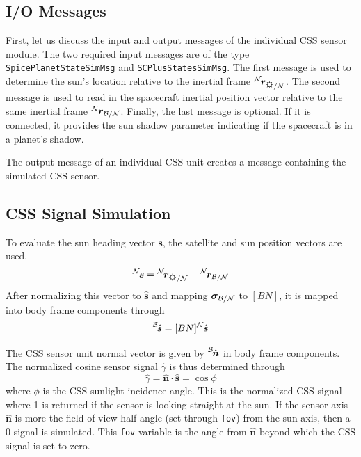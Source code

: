 \documentclass[]{BasiliskReportMemo}
\begin{document}
\subsection{I/O Messages}
First, let us discuss the input and output messages of the individual CSS sensor module.  The two required input messages are of the type {\tt SpicePlanetStateSimMsg} and {\tt SCPlusStatesSimMsg}.  The first message is used to determine the sun's location relative to the inertial frame $\leftexp{N}{\bm r}_{\sun/\mathcal{N}}$.  The second message is used to read in the spacecraft inertial position vector relative to the same inertial frame $\leftexp{N}{\bm r}_{\cal B/N}$.  Finally, the last message is optional.  If it is connected, it provides the sun shadow parameter indicating if the spacecraft is in a planet's shadow.  

The output message of an individual CSS unit creates a message containing the simulated CSS sensor.


\subsection{CSS Signal Simulation}
To evaluate the sun heading vector $\bm s$, the satellite and sun position vectors are used.
\begin{equation}
	\leftexp{N}{\bm s} = \leftexp{N}{\bm r}_{\sun/\mathcal{N}} - \leftexp{N}{\bm r}_{\cal B/N}
\end{equation}
After normalizing this vector to $\hat{\bm s}$ and mapping $\bm\sigma_{\cal B/N}$ to $[BN]$, it is mapped into body frame components through
\begin{equation}
	\leftexp{B}{\hat{\bm s}} = [BN] \leftexp{N}{\hat{\bm s}}
\end{equation}

The CSS sensor unit normal vector is given by $\leftexp{B}{\hat{\bm n}}$ in body frame components.  The normalized cosine sensor signal $\hat\gamma$ is thus determined through
\begin{equation}
	\hat \gamma = \hat{\bm n} \cdot \hat{\bm s} = \cos\phi
\end{equation}
where $\phi$ is the CSS sunlight incidence angle.  
This is the normalized CSS signal where 1 is returned if the sensor is looking straight at the sun.  If the sensor axis $\hat{\bm n}$ is more the field of view half-angle (set through {\tt fov}) from the sun axis, then a 0 signal is simulated.  This {\tt fov} variable is the angle from $\hat{\bm n}$ beyond which the CSS signal is set to zero.  
\end{document}
